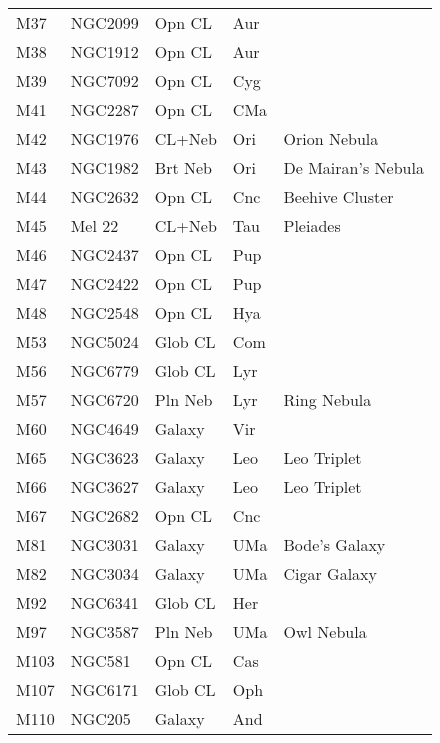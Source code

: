 \begin{longtable}{ p{0.7in}  p{1.0in}  p{0.6in}  p{0.9in}  p{5.1in} }
M37 & NGC2099 & Opn CL & Aur &  \\ 
M38 & NGC1912 & Opn CL & Aur &  \\ 
M39 & NGC7092 & Opn CL & Cyg &  \\ 
M41 & NGC2287 & Opn CL & CMa &  \\ 
M42 & NGC1976 & CL+Neb & Ori & Orion Nebula \\ 
M43 & NGC1982 & Brt Neb & Ori & De Mairan's Nebula \\ 
M44 & NGC2632 & Opn CL & Cnc & Beehive Cluster \\ 
M45 & Mel 22 & CL+Neb & Tau & Pleiades \\ 
M46 & NGC2437 & Opn CL & Pup &  \\ 
M47 & NGC2422 & Opn CL & Pup &  \\ 
M48 & NGC2548 & Opn CL & Hya &  \\ 
M53 & NGC5024 & Glob CL & Com &  \\ 
M56 & NGC6779 & Glob CL & Lyr &  \\ 
M57 & NGC6720 & Pln Neb & Lyr & Ring Nebula \\ 
M60 & NGC4649 & Galaxy & Vir &  \\ 
M65 & NGC3623 & Galaxy & Leo & Leo Triplet \\ 
M66 & NGC3627 & Galaxy & Leo & Leo Triplet \\ 
M67 & NGC2682 & Opn CL & Cnc &  \\ 
M81 & NGC3031 & Galaxy & UMa & Bode's Galaxy \\ 
M82 & NGC3034 & Galaxy & UMa & Cigar Galaxy \\ 
M92 & NGC6341 & Glob CL & Her &  \\ 
M97 & NGC3587 & Pln Neb & UMa & Owl Nebula \\ 
M103 & NGC581 & Opn CL & Cas &  \\ 
M107 & NGC6171 & Glob CL & Oph &  \\ 
M110 & NGC205 & Galaxy & And &  \\ 
\hline 
\end{longtable} 
